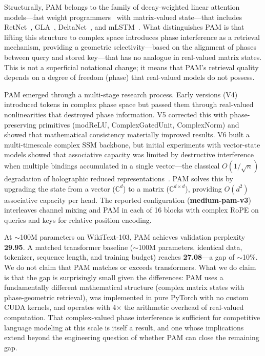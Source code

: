 \documentclass[11pt]{article}
\newcommand{\Complex}{\mathbb{C}}
\begin{document}
Structurally, PAM belongs to the family of decay-weighted linear attention models---fast weight programmers~\cite{schmidhuber1992learning,schlag2021linear} with matrix-valued state---that includes RetNet~\cite{sun2023retentive}, GLA~\cite{yang2024gated}, DeltaNet~\cite{yang2024deltanet}, and mLSTM~\cite{beck2024xlstm}. What distinguishes PAM is that lifting this structure to complex space introduces phase interference as a retrieval mechanism, providing a geometric selectivity---based on the alignment of phases between query and stored key---that has no analogue in real-valued matrix states. This is not a superficial notational change; it means that PAM's retrieval quality depends on a degree of freedom (phase) that real-valued models do not possess.

PAM emerged through a multi-stage research process. Early versions (V4) introduced tokens in complex phase space but passed them through real-valued nonlinearities that destroyed phase information. V5 corrected this with phase-preserving primitives (modReLU, ComplexGatedUnit, ComplexNorm) and showed that mathematical consistency materially improved results. V6 built a multi-timescale complex SSM backbone, but initial experiments with vector-state models showed that associative capacity was limited by destructive interference when multiple bindings accumulated in a single vector---the classical $O(1/\sqrt{n})$ degradation of holographic reduced representations~\cite{plate1995holographic}. PAM solves this by upgrading the state from a vector ($\Complex^d$) to a matrix ($\Complex^{d \times d}$), providing $O(d^2)$ associative capacity per head. The reported configuration (\textbf{medium-pam-v3}) interleaves channel mixing and PAM in each of 16 blocks with complex RoPE on queries and keys for relative position encoding.

At $\sim$100M parameters on WikiText-103, PAM achieves validation perplexity \textbf{29.95}. A matched transformer baseline ($\sim$100M parameters, identical data, tokenizer, sequence length, and training budget) reaches \textbf{27.08}---a gap of $\sim$10\%. We do not claim that PAM matches or exceeds transformers. What we do claim is that the gap is surprisingly small given the differences: PAM uses a fundamentally different mathematical structure (complex matrix states with phase-geometric retrieval), was implemented in pure PyTorch with no custom CUDA kernels, and operates with 4$\times$ the arithmetic overhead of real-valued computation. That complex-valued phase interference is sufficient for competitive language modeling at this scale is itself a result, and one whose implications extend beyond the engineering question of whether PAM can close the remaining gap.
\end{document}
